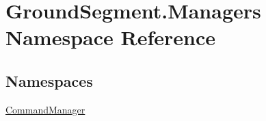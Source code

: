 \hypertarget{namespace_ground_segment_1_1_managers}{}\section{Ground\+Segment.\+Managers Namespace Reference}
\label{namespace_ground_segment_1_1_managers}
\subsection*{Namespaces}
\begin{DoxyCompactItemize}
\item 
 \hyperlink{namespace_ground_segment_1_1_managers_1_1_command_manager}{Command\+Manager}
\end{DoxyCompactItemize}

